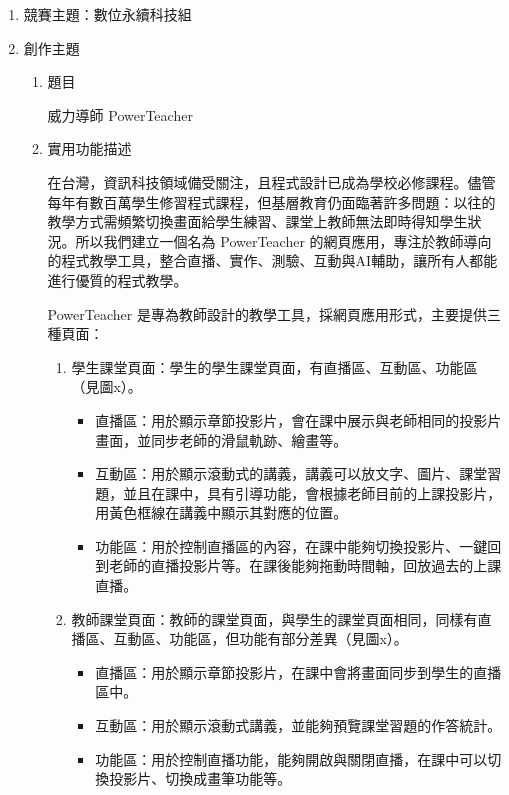 \documentclass[12pt]{article}
\begin{document}
\begin{enumerate}
  \setlength{\parindent}{2em}
  \item 競賽主題：數位永續科技組 
  \item 創作主題
    \begin{enumerate}
      \setlength{\parindent}{2em}
      \item 題目
        \par 威力導師 PowerTeacher
      \item 實用功能描述
        \par 在台灣，資訊科技領域備受關注，且程式設計已成為學校必修課程。儘管每年有數百萬學生修習程式課程，但基層教育仍面臨著許多問題：以往的教學方式需頻繁切換畫面給學生練習、課堂上教師無法即時得知學生狀況。所以我們建立一個名為 PowerTeacher 的網頁應用，專注於教師導向的程式教學工具，整合直播、實作、測驗、互動與AI輔助，讓所有人都能進行優質的程式教學。
        \par PowerTeacher 是專為教師設計的教學工具，採網頁應用形式，主要提供三種頁面：
        \begin{enumerate}[label=(\arabic*)]
          \item 學生課堂頁面：學生的學生課堂頁面，有直播區、互動區、功能區（見圖x）。
            \begin{itemize}
              \item 直播區：用於顯示章節投影片，會在課中展示與老師相同的投影片畫面，並同步老師的滑鼠軌跡、繪畫等。
              \item 互動區：用於顯示滾動式的講義，講義可以放文字、圖片、課堂習題，並且在課中，具有引導功能，會根據老師目前的上課投影片，用黃色框線在講義中顯示其對應的位置。
              \item 功能區：用於控制直播區的內容，在課中能夠切換投影片、一鍵回到老師的直播投影片等。在課後能夠拖動時間軸，回放過去的上課直播。
            \end{itemize}
          \item 教師課堂頁面：教師的課堂頁面，與學生的課堂頁面相同，同樣有直播區、互動區、功能區，但功能有部分差異（見圖x）。
            \begin{itemize}
              \item 直播區：用於顯示章節投影片，在課中會將畫面同步到學生的直播區中。
              \item 互動區：用於顯示滾動式講義，並能夠預覽課堂習題的作答統計。
              \item 功能區：用於控制直播功能，能夠開啟與關閉直播，在課中可以切換投影片、切換成畫筆功能等。
            \end{itemize}

\end{enumerate}
\end{enumerate}
\end{enumerate}
\end{document}
